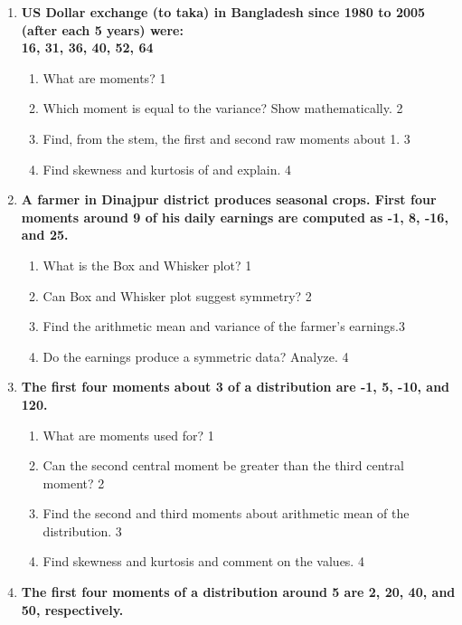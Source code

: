 \documentclass[a4paper,oneside]{book}
\begin{document}
  \begin{enumerate}
 \item
	  \textbf{US Dollar exchange (to taka) in Bangladesh since 1980 to 2005 (after each 5 years) were: \\ 16, 31, 36, 40, 52, 64} 
  
  \begin{enumerate}
    \item
	What are moments? \hfill 1
    \item
	Which moment is equal to the variance? Show mathematically. \hfill 2
    \item  
	Find, from the stem, the first and second raw moments about 1. \hfill 3
    \item
	Find skewness and kurtosis of and explain. \hfill 4
\end{enumerate}

 \item
	  \textbf{A farmer in Dinajpur district produces seasonal crops. First four moments around 9 of his daily earnings are computed as -1, 8, -16, and 25.}
  
  \begin{enumerate}
    \item
	What is the Box and Whisker plot? \hfill 1
    \item
	Can Box and Whisker plot suggest symmetry? \hfill 2
    \item  
	 Find the arithmetic mean and variance of the farmer's earnings.\hfill 3
    \item
	Do the earnings produce a symmetric data? Analyze. \hfill 4
  \end{enumerate}

 \item
	  \textbf{The first four moments about 3 of a distribution are -1, 5, -10, and 120.} 
  
  \begin{enumerate}
    \item
	What are moments used for? \hfill 1
    \item
	Can the second central moment be greater than the third central moment? \hfill 2
    \item  
	Find the second and third moments about arithmetic mean of the distribution. \hfill 3
    \item
	Find skewness and kurtosis and comment on the values.  \hfill 4
\end{enumerate}

  \item
	  \textbf{The first four moments of a distribution around 5 are 2, 20, 40, and 50, respectively.} 
  

\end{enumerate}
\end{document}
